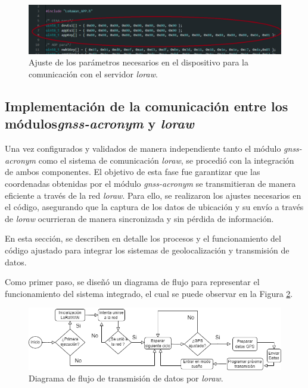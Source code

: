 \begin{figure}[H]
\leavevmode
\begin{minipage}{\textwidth}
\begin{center}
\includegraphics[width=\textwidth]{./capitulo_04/imagen/otta.png}
\caption{Ajuste de los parámetros necesarios en el dispositivo para la comunicación con el servidor \textit{\acrshort{loraw}}. \label{fig:dispositivo}}
\end{center}
\end{minipage}
\end{figure}


\subsection{Implementación de la comunicación entre los módulos\textit{\acrshort{gnss-acronym}} y \textit{\acrshort{loraw}}}

Una vez configurados y validados de manera independiente tanto el módulo \textit{\acrshort{gnss-acronym}} como el sistema de comunicación \textit{\acrshort{loraw}}, se procedió con la integración de ambos componentes. El objetivo de esta fase fue garantizar que las coordenadas obtenidas por el módulo \textit{\acrshort{gnss-acronym}} se transmitieran de manera eficiente a través de la red \textit{\acrshort{loraw}}. Para ello, se realizaron los ajustes necesarios en el código, asegurando que la captura de los datos de ubicación y su envío a través de \textit{\acrshort{loraw}} ocurrieran de manera sincronizada y sin pérdida de información.

En esta sección, se describen en detalle los procesos y el funcionamiento del código ajustado para integrar los sistemas de geolocalización y transmisión de datos.

Como primer paso, se diseñó un diagrama de flujo para representar el funcionamiento del sistema integrado, el cual se puede observar en la Figura \ref{fig:flujo}.

\begin{figure}[H]
\leavevmode
\begin{minipage}{\textwidth}
\begin{center}
\includegraphics[width=\textwidth]{./capitulo_04/imagen/diagramadeflujognss.png}
\caption{Diagrama de flujo de transmisión de datos por \textit{\acrshort{loraw}}. \label{fig:flujo}}
\end{center}
\end{minipage}
\end{figure}


